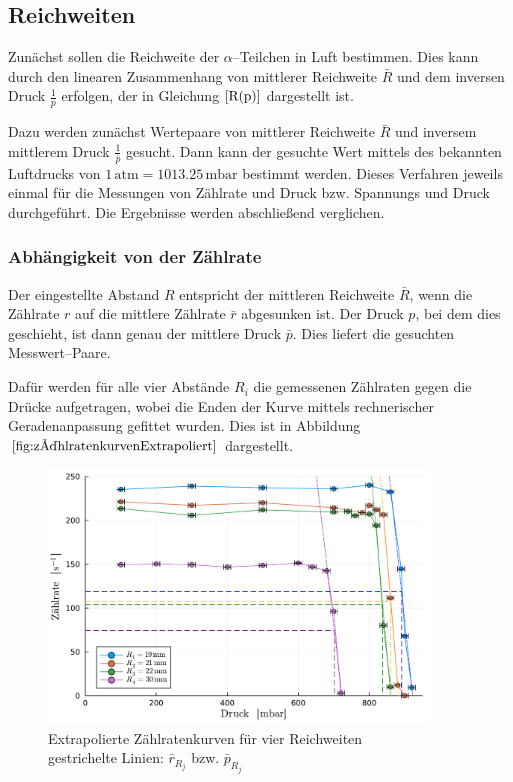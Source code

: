 \documentclass[12pt,a4paper]{scrartcl}
\numberwithin{equation}{section} %
\begin{document}
\hypertarget{reichweiten}{%
\subsection{Reichweiten}\label{reichweiten}}

Zunächst sollen die Reichweite der $\alpha$--Teilchen in Luft bestimmen. Dies kann durch den linearen Zusammenhang von mittlerer Reichweite $\bar R$ und dem inversen Druck $\frac{1}{p}$ erfolgen, der in Gleichung $\eqref{R(p)}$ dargestellt ist.

Dazu werden zunächst Wertepaare von mittlerer Reichweite $\bar{R}$ und inversem mittlerem Druck $\frac{1}{\bar{p}}$ gesucht. Dann kann der gesuchte Wert mittels des bekannten Luftdrucks von $1 \mathrm{\,atm} = 1013.25 \mathrm{\,mbar}$ bestimmt werden. Dieses Verfahren jeweils einmal für die Messungen von Zählrate und Druck bzw. Spannungs und Druck durchgeführt. Die Ergebnisse werden abschließend verglichen.

\hypertarget{bestimmung-durch-zuxe4hlraten}{%
\subsubsection{Abhängigkeit von der Zählrate}\label{bestimmung-durch-zuxe4hlraten}}

Der eingestellte Abstand $R$ entspricht der mittleren Reichweite $\bar{R}$, wenn die Zählrate $r$ auf die mittlere Zählrate $\bar{r}$ abgesunken ist. Der Druck $p$, bei dem dies geschieht, ist dann genau der mittlere Druck $\bar{p}$. Dies liefert die gesuchten Messwert--Paare.

Dafür werden für alle vier Abstände $R_i$ die gemessenen Zählraten gegen die Drücke aufgetragen, wobei die Enden der Kurve mittels rechnerischer Geradenanpassung gefittet wurden. Dies ist in Abbildung $\ref{fig:zählratenkurvenExtrapoliert}$ dargestellt.

\begin{figure}[h!]
	\centering
	\includegraphics[width=0.9\textwidth]{../media/B3.3/zaehlratenkurven extrapoliert.pdf}
	\caption{Extrapolierte Zählratenkurven für vier Reichweiten\\
			gestrichelte Linien: $\bar r_{R_j}$ bzw. $\bar p_{R_j}$}
	\label{fig:zählratenkurvenExtrapoliert}
\end{figure}
\end{document}
